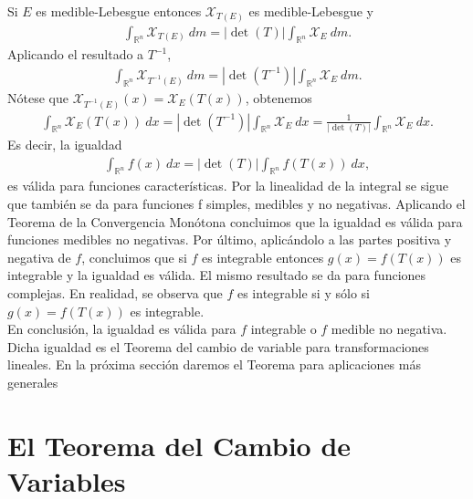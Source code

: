 \begin{obs}
Si $E$ es medible-Lebesgue entonces $\mathcal{X}_{T(E)}$ es medible-Lebesgue y
\begin{align*}
    \int_{\mathbb{R}^n}{\mathcal{X}_{T(E)} \ dm} = |\det(T)|\int_{\mathbb{R}^n}{\mathcal{X}_{E} \ dm}.
\end{align*}
Aplicando el resultado a $T^{-1}$,
\begin{align*}
    \int_{\mathbb{R}^n}{\mathcal{X}_{T^{-1}(E)} \ dm} = |\det(T^{-1})|\int_{\mathbb{R}^n}{\mathcal{X}_{E} \ dm}.
\end{align*}
Nótese que $\mathcal{X}_{T^{-1}(E)}(x) = \mathcal{X}_{E}{(T(x))}$, obtenemos
\begin{align*}
    \int_{\mathbb{R}^n}{\mathcal{X}_E(T(x)) \ dx} = |\det(T^{-1})|\int_{\mathbb{R}^n}{\mathcal{X}_{E} \ dx} = \frac{1}{|\det(T)|}\int_{\mathbb{R}^n}{\mathcal{X}_{E} \ dx}. 
\end{align*}
Es decir, la igualdad
\begin{align*}
    \boxed{
    \int_{\mathbb{R}^n}{f(x) \ dx} = |\det(T)|\int_{\mathbb{R}^n}{f(T(x)) \ dx},
    }
\end{align*}
es válida para funciones características. Por la linealidad de la integral se sigue que también se da para funciones f simples, medibles y no negativas. Aplicando el Teorema de la Convergencia Monótona concluimos que la igualdad es válida para funciones medibles no negativas. Por último, aplicándolo a las partes positiva y negativa de $f$, concluimos que si $f$ es integrable entonces $g(x) = f(T(x))$ es integrable y la igualdad es válida. El mismo resultado se da para funciones complejas. En realidad, se observa que $f$ es integrable si y sólo si $g(x) = f(T(x))$ es integrable.
\\
\newline
En conclusión, la igualdad es válida para $f$ integrable o $f$ medible no negativa. Dicha igualdad es el Teorema del cambio de variable para transformaciones lineales. En la próxima sección daremos el Teorema para aplicaciones más generales
\end{obs}

\section{El Teorema del Cambio de Variables}

